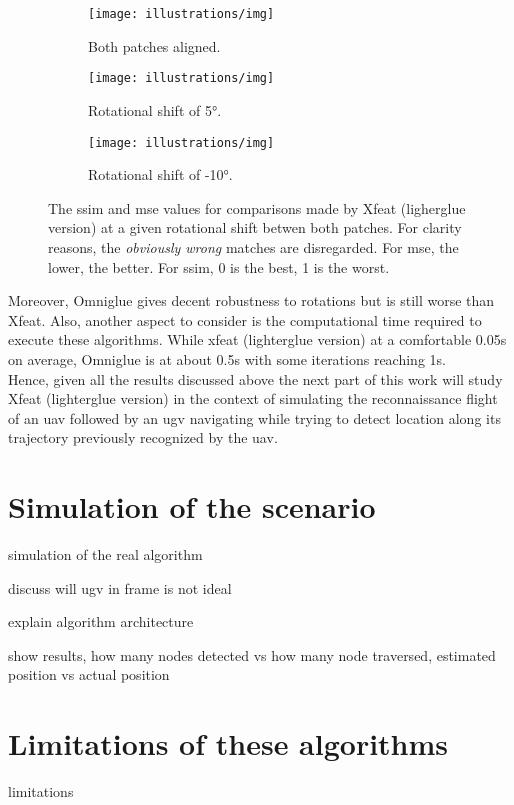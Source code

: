 \begin{figure}[ht!]
    \centering
    \begin{subfigure}[t]{0.32\textwidth}
        \texttt{[image: illustrations/img]}
        \caption{Both patches aligned.}
        \label{fig:find_corr:small_angles:mse_ssim_xfeat+lg_0} %
    \end{subfigure}
    \hfill
    \begin{subfigure}[t]{0.32\textwidth}
        \texttt{[image: illustrations/img]}
        \caption{Rotational shift of 5°.}
        \label{fig:find_corr:small_angles:mse_ssim_xfeat+lg_5}
    \end{subfigure}
    \hfill
    \begin{subfigure}[t]{0.32\textwidth}
        \texttt{[image: illustrations/img]}
        \caption{Rotational shift of -10°.}
        \label{fig:find_corr:small_angles:mse_ssim_xfeat+lg_-10}
    \end{subfigure}
    \caption{The \gls{ssim} and \gls{mse} values for comparisons made by Xfeat (ligherglue version) at a given rotational shift betwen both patches.
    For clarity reasons, the \textit{obviously wrong} matches are disregarded.
    For \gls{mse}, the lower, the better. For \gls{ssim}, 0 is the best, 1 is the worst.}
    \label{fig:find_corr:small_angles:mse_ssim}
\end{figure}

Moreover, Omniglue gives decent robustness to rotations but is still worse than Xfeat.
Also, another aspect to consider is the computational time required to execute these algorithms.
While xfeat (lighterglue version) at a comfortable 0.05s on average, Omniglue is at about 0.5s with some iterations reaching
1s.\\ %
Hence, given all the results discussed above the next part of this work will study Xfeat (lighterglue version) in the context of simulating
the reconnaissance flight of an \gls{uav} followed by an \gls{ugv} navigating while trying to detect location along its trajectory previously
recognized by the \gls{uav}.


\section{Simulation of the scenario}

simulation of the real algorithm

discuss will ugv in frame is not ideal

explain algorithm architecture

show results, how many nodes detected vs how many node traversed, estimated position vs actual position


\section{Limitations of these algorithms}

limitations

